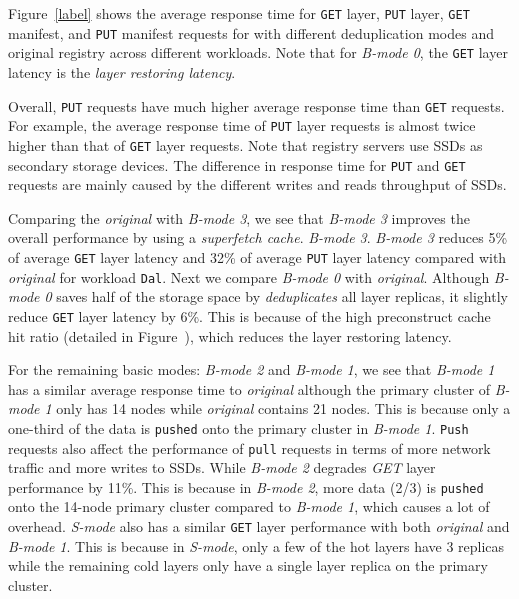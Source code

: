 Figure~\ref{label} shows the average response time for \texttt{GET} layer, \texttt{PUT} layer, \texttt{GET} manifest, and \texttt{PUT} manifest requests for \sysname with different deduplication modes and original registry across different workloads.
Note that for \emph{B-mode 0}, the \texttt{GET} layer latency is the \emph{layer restoring latency}.

Overall, \texttt{PUT} requests have much higher average response time than \texttt{GET} requests.
For example, the average response time of 
\texttt{PUT} layer requests is almost twice higher than that of \texttt{GET} layer requests.
Note that registry servers use SSDs as secondary storage devices.
The difference in response time for \texttt{PUT} and \texttt{GET} requests are mainly caused by the different writes and reads throughput of SSDs. 

Comparing the \emph{original} with \emph{B-mode 3},
we see that \emph{B-mode 3} improves the overall performance by using a \emph{superfetch cache}.
\emph{B-mode 3}.
\emph{B-mode 3} reduces 5\% of average \texttt{GET} layer latency
and 32\% of average \texttt{PUT} layer latency compared with \emph{original} for workload \texttt{Dal}.
Next we compare \emph{B-mode 0} with \emph{original}.
Although \emph{B-mode 0} saves half of the storage space
by \emph{deduplicates} all layer replicas,
it slightly reduce \texttt{GET} layer latency by 6\%.
This is because of the high preconstruct cache hit ratio (detailed in Figure~\cite{xxx}), 
which reduces the layer restoring latency.

For the remaining basic modes: \emph{B-mode 2} and \emph{B-mode 1},
we see that \emph{B-mode 1} has a similar average response time to \emph{original}
although the primary cluster of \emph{B-mode 1} only has 14 nodes while 
\emph{original} contains 21 nodes.
This is because only a one-third of the %
data is \texttt{pushed} onto the primary cluster in \emph{B-mode 1}.
\texttt{Push} requests also affect the performance of \texttt{pull} requests
in terms of more network traffic and more writes to SSDs.
While \emph{B-mode 2} degrades \emph{GET} layer performance by 11\%.
This is because in \emph{B-mode 2},
more data (2/3) is \texttt{pushed} onto the 14-node primary cluster compared to \emph{B-mode 1},
which causes a lot of overhead.
\emph{S-mode} also has a similar \texttt{GET} layer performance with both \emph{original} and \emph{B-mode 1}.
This is because in \emph{S-mode}, only a few of the hot layers have 3 replicas while the remaining cold layers only have a single layer replica on the primary cluster. 

